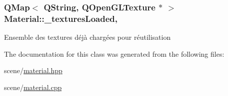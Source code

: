 \hypertarget{class_material_a9f91b9fda835fed049df5c6959043623}{
\subsubsection[{\+\_\+textures\+Loaded}]{\setlength{\rightskip}{0pt plus 5cm}Q\+Map$<$ Q\+String, Q\+Open\+G\+L\+Texture $\ast$ $>$ Material\+::\+\_\+textures\+Loaded\hspace{0.3cm}{\ttfamily [static]}, {\ttfamily [private]}}}\label{class_material_a9f91b9fda835fed049df5c6959043623}
Ensemble des textures déjà chargées pour réutilisation 

The documentation for this class was generated from the following files\+:\begin{DoxyCompactItemize}
\item 
scene/\hyperlink{material_8hpp}{material.\+hpp}\item 
scene/\hyperlink{material_8cpp}{material.\+cpp}\end{DoxyCompactItemize}
